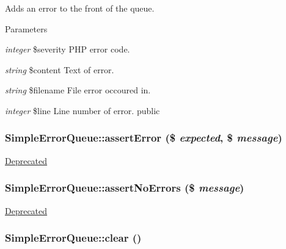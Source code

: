 \label{class_simple_error_queue_adc13ee1f476b5ec158e3681fffa83421}
Adds an error to the front of the queue. 
\begin{DoxyParams}{Parameters}
\item[{\em integer}]\$severity PHP error code. \item[{\em string}]\$content Text of error. \item[{\em string}]\$filename File error occoured in. \item[{\em integer}]\$line Line number of error.  public \end{DoxyParams}
\hypertarget{class_simple_error_queue_a33b8d8d7f89b97018a495032362a9897}{
\subsubsection[{assertError}]{\setlength{\rightskip}{0pt plus 5cm}SimpleErrorQueue::assertError (\$ {\em expected}, \/  \$ {\em message})}}
\label{class_simple_error_queue_a33b8d8d7f89b97018a495032362a9897}
\begin{Desc}
\item[\hyperlink{deprecated__deprecated000002}{Deprecated}]\end{Desc}
\hypertarget{class_simple_error_queue_a87cf536e2597e0a6c2551fcdde27492d}{
\subsubsection[{assertNoErrors}]{\setlength{\rightskip}{0pt plus 5cm}SimpleErrorQueue::assertNoErrors (\$ {\em message})}}
\label{class_simple_error_queue_a87cf536e2597e0a6c2551fcdde27492d}
\begin{Desc}
\item[\hyperlink{deprecated__deprecated000001}{Deprecated}]\end{Desc}
\hypertarget{class_simple_error_queue_a35fde0c9340bed6665ac8a16d66f9501}{
\subsubsection[{clear}]{\setlength{\rightskip}{0pt plus 5cm}SimpleErrorQueue::clear ()}}
